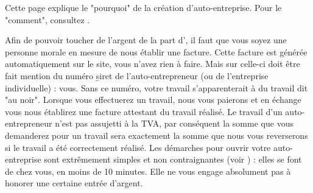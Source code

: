 ﻿Cette page explique le "pourquoi" de la création d'auto-entreprise. Pour le "comment", consultez .

Afin de pouvoir toucher de l'argent de la part d'\eDevoir, il faut que vous soyez une personne morale en mesure de nous établir une facture. Cette facture est générée automatiquement sur le site, vous n'avez rien à faire. Mais sur celle-ci doit être fait mention du numéro \b{siret} de l'auto-entrepreneur (ou de l'entreprise individuelle) : vous. Sans ce numéro, votre travail s'apparenterait à du travail dit "au noir". Lorsque vous effectuerez un travail, nous vous paierons et en échange vous nous établirez une facture attestant du travail réalisé. Le travail d'un auto-entrepreneur n'est pas assujetti à la TVA, par conséquent la somme que vous demanderez pour un travail sera exactement la somme que nous vous reverserons si le travail a été correctement réalisé.
Les démarches pour ouvrir votre auto-entreprise sont extrêmement simples et non contraignantes (voir ) : elles se font de chez vous, en moins de 10 minutes. Elle ne vous engage absolument pas à honorer une certaine entrée d'argent.